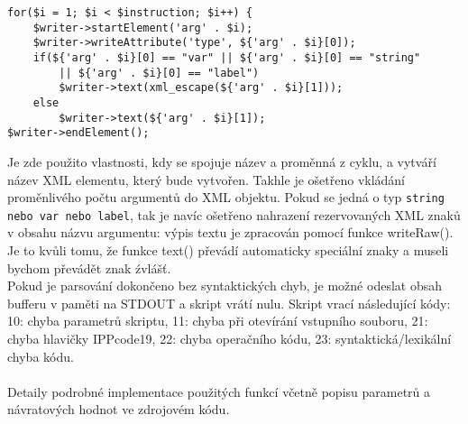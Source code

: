 \documentclass[10pt]{article}
\begin{document}
\begin{lstlisting}
for($i = 1; $i < $instruction; $i++) {
	$writer->startElement('arg' . $i);
	$writer->writeAttribute('type', ${'arg' . $i}[0]);
	if(${'arg' . $i}[0] == "var" || ${'arg' . $i}[0] == "string"
        || ${'arg' . $i}[0] == "label")
		$writer->text(xml_escape(${'arg' . $i}[1]));
	else
		$writer->text(${'arg' . $i}[1]);
$writer->endElement();
\end{lstlisting}
Je zde použito vlastnosti, kdy se spojuje název a proměnná z cyklu, a vytváří název XML elementu, který bude vytvořen. Takhle je ošetřeno vkládání proměnlivého počtu argumentů do XML objektu. Pokud se jedná o typ \texttt{string nebo var nebo label}, tak je navíc ošetřeno nahrazení rezervovaných XML znaků v obsahu názvu argumentu: výpis textu je zpracován pomocí funkce writeRaw(). Je to kvůli tomu, že funkce text() převádí automaticky speciální znaky a museli bychom převádět znak \' zvlášť.\\
Pokud je parsování dokončeno bez syntaktických chyb, je možné odeslat obsah bufferu v paměti na STDOUT a skript vrátí nulu. Skript vrací následující kódy: 10: chyba parametrů skriptu, 11: chyba při otevírání vstupního souboru, 21: chyba hlavičky IPPcode19, 22: chyba operačního kódu, 23: syntaktická/lexikální chyba kódu.\\\\
Detaily podrobné implementace použitých funkcí včetně popisu parametrů a návratových hodnot ve zdrojovém kódu.
\end{document}
